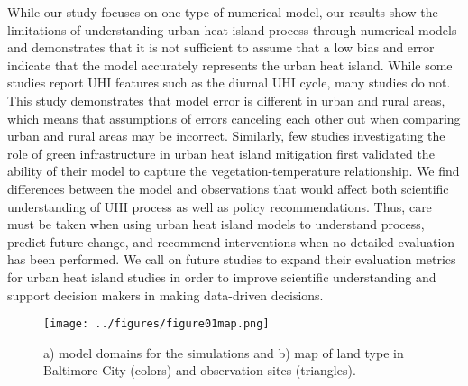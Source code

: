 \documentclass[draft,linenumbers]{agujournal}
\begin{document}
While our study focuses on one type of numerical model, our results show the limitations of understanding urban heat island process through numerical models and demonstrates that it is not sufficient to assume that a low bias and error indicate that the model accurately represents the urban heat island.  While some studies report UHI features such as the diurnal UHI cycle, many studies do not. This study demonstrates that model error is different in urban and rural areas, which means that assumptions of errors canceling each other out when comparing urban and rural areas may be incorrect. Similarly, few studies investigating the role of green infrastructure in urban heat island mitigation first validated the ability of their model to capture the vegetation-temperature relationship. We find differences between the model and observations that would affect both scientific understanding of UHI process as well as policy recommendations. 
Thus, care must be taken when using urban heat island models to understand process, predict future change, and recommend interventions when no detailed evaluation has been performed. We call on future studies to expand their evaluation metrics for urban heat island studies in order to improve scientific understanding and support decision makers in making data-driven decisions. 





%
%
%
%
\begin{figure}[h]
\centering
\texttt{[image: ../figures/figure01map.png]}
\caption{a) model domains for the simulations and b) map of land type in Baltimore City (colors) and observation sites (triangles).}
\label{fig:map}
 \end{figure}
 
\end{document}
